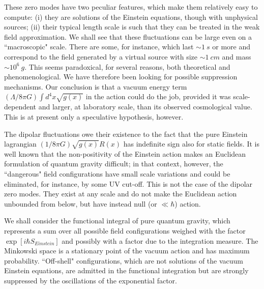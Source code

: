 \documentclass[a4paper,11pt]{article}
\begin{document}
These zero modes have two peculiar features, which make
them relatively easy to compute: (i) they are solutions of the
Einstein equations, though with unphysical sources;
(ii) their typical length scale is such that they can
be treated in the weak field approximation. We shall see
that these fluctuations can be large even on a
``macroscopic" scale. There are some, for instance, which
last $\sim 1 \ s$ or more and correspond to the field
generated by a virtual source with size $\sim 1 \ cm$
and mass $\sim 10^6 \ g$. This seems paradoxical, for
several reasons, both theoretical and phenomenological.
We have
therefore been looking for possible suppression
mechanisms. Our conclusion is that a vacuum energy term
$(\Lambda/8\pi G)\int d^4x \sqrt{g(x)}$ in the action
could do the job, provided it was scale-dependent and
larger, at laboratory scale, than its observed
cosmological value. This is at present only a speculative
hypothesis, however.

The dipolar fluctuations owe their existence to the fact
that the pure Einstein lagrangian $(1/8\pi G) 
\sqrt{g(x)} R(x)$ has indefinite sign also for static
fields. It is well known that the non-positivity of
the Einstein action makes an Euclidean formulation of
quantum gravity difficult; in that context, however,
the ``dangerous" field configurations have small
scale variations and could be eliminated, for instance,
by some UV cut-off. This is not the case of the dipolar
zero modes. They exist at any scale and do not make the
Euclidean action unbounded from below, but have instead
null (or $\ll \hbar$) action.

We shall consider the functional integral of pure quantum 
gravity, which represents a sum over all possible field 
configurations weighed with the factor $\exp[i\hbar
S_{Einstein}]$ and possibly with a factor due to the 
integration measure. The Minkowski space is a stationary 
point of the vacuum action and has maximum probability.
``Off-shell" configurations, which are not solutions of 
the vacuum Einstein equations, are admitted in the 
functional integration but are strongly suppressed by 
the oscillations of the exponential factor.
\end{document}
